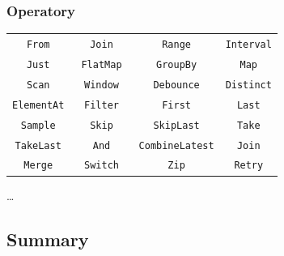 \documentclass[24pt,handout]{beamer}
\begin{document}
\begin{frame}
    \frametitle{Operatory}

    \begin{center}
        \def\arraystretch{1.8}
        \begin{tabular}{cccc}
            \texttt{From} &~\texttt{Join} &~\texttt{Range} & \texttt{Interval} \\
            \texttt{Just} &~\texttt{FlatMap} &~\texttt{GroupBy} & \texttt{Map} \\
            \texttt{Scan} &~\texttt{Window} &~\texttt{Debounce} & \texttt{Distinct} \\
            \texttt{ElementAt} &~\texttt{Filter} &~\texttt{First} & \texttt{Last} \\
            \texttt{Sample} &~\texttt{Skip} &~\texttt{SkipLast} & \texttt{Take} \\
            \texttt{TakeLast} &~\texttt{And} &~\texttt{CombineLatest} & \texttt{Join} \\
            \texttt{Merge} &~\texttt{Switch} &~\texttt{Zip} & \texttt{Retry}
        \end{tabular}

        \vspace{2ex}

        \dots
    \end{center}

\end{frame}

\subsection{Summary}
\end{document}
